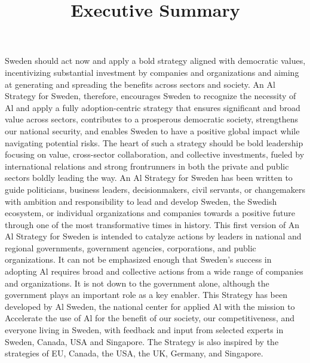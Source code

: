 \title{
Executive Summary
}
Sweden should act now and apply a bold strategy aligned with democratic values, incentivizing substantial investment by companies and organizations and aiming at generating and spreading the benefits across sectors and society.
An Al Strategy for Sweden, therefore, encourages Sweden to recognize the necessity of Al and apply a fully adoption-centric strategy that ensures significant and broad value across sectors, contributes to a prosperous democratic society, strengthens our national security, and enables Sweden to have a positive global impact while navigating potential risks.
The heart of such a strategy should be bold leadership focusing on value, cross-sector collaboration, and collective investments, fueled by international relations and strong frontrunners in both the private and public sectors boldly leading the way.
An Al Strategy for Sweden has been written to guide politicians, business leaders, decisionmakers, civil servants, or changemakers with ambition and responsibility to lead and develop Sweden, the Swedish ecosystem, or individual organizations and companies towards a positive future through one of the most transformative times in history.
This first version of An Al Strategy for Sweden is intended to catalyze actions by leaders in national and regional governments, government agencies, corporations, and public organizations.
It can not be emphasized enough that Sweden's success in adopting Al requires broad and collective actions from a wide range of companies and organizations. It is not down to the government alone, although the government plays an important role as a key enabler.
This Strategy has been developed by Al Sweden, the national center for applied Al with the mission to Accelerate the use of Al for the benefit of our society, our competitiveness, and everyone living in Sweden, with feedback and input from selected experts in Sweden, Canada, USA and Singapore. The Strategy is also inspired by the strategies of EU, Canada, the USA, the UK, Germany, and Singapore.

